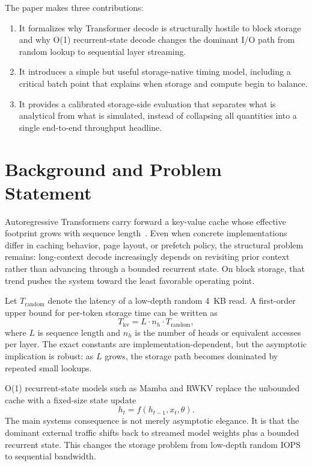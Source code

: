\documentclass[11pt]{article}
\begin{document}
The paper makes three contributions:
\begin{enumerate}
    \item It formalizes why Transformer decode is structurally hostile to block storage and why O(1) recurrent-state decode changes the dominant I/O path from random lookup to sequential layer streaming.
    \item It introduces a simple but useful storage-native timing model, including a critical batch point that explains when storage and compute begin to balance.
    \item It provides a calibrated storage-side evaluation that separates what is analytical from what is simulated, instead of collapsing all quantities into a single end-to-end throughput headline.
\end{enumerate}

\section{Background and Problem Statement}
Autoregressive Transformers carry forward a key-value cache whose effective footprint grows with sequence length~\cite{vaswani}. Even when concrete implementations differ in caching behavior, page layout, or prefetch policy, the structural problem remains: long-context decode increasingly depends on revisiting prior context rather than advancing through a bounded recurrent state. On block storage, that trend pushes the system toward the least favorable operating point.

Let $T_{\text{random}}$ denote the latency of a low-depth random 4~KB read. A first-order upper bound for per-token storage time can be written as
\begin{equation}
T_{\text{kv}} = L \cdot n_h \cdot T_{\text{random}},
\end{equation}
where $L$ is sequence length and $n_h$ is the number of heads or equivalent accesses per layer. The exact constants are implementation-dependent, but the asymptotic implication is robust: as $L$ grows, the storage path becomes dominated by repeated small lookups.

O(1) recurrent-state models such as Mamba and RWKV replace the unbounded cache with a fixed-size state update
\begin{equation}
h_t = f(h_{t-1}, x_t, \theta).
\end{equation}
The main systems consequence is not merely asymptotic elegance. It is that the dominant external traffic shifts back to streamed model weights plus a bounded recurrent state. This changes the storage problem from low-depth random IOPS to sequential bandwidth.
\end{document}
